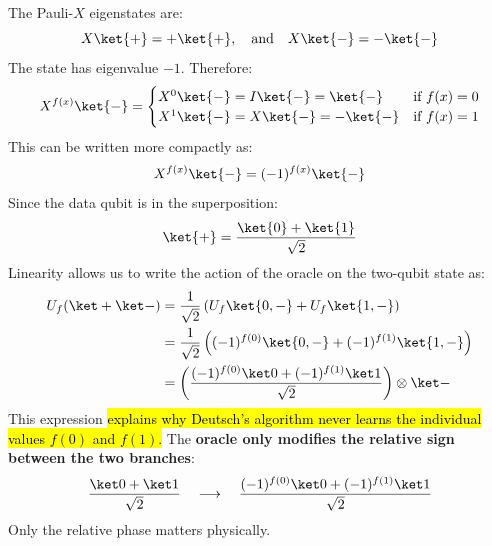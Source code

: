 \highspace
The Pauli-$X$ eigenstates are:
\begin{equation*}
    X\ket{+} = +\ket{+}, \quad \text{and} \quad X\ket{-} = -\ket{-}
\end{equation*}
The state \ket{-} has eigenvalue $-1$. Therefore:
\begin{equation*}
    X^{f(x)} \ket{-} = \begin{cases}
        X^{0} \ket{-} = I\ket{-} = \ket{-} & \text{if } f(x) = 0 \\
        X^{1} \ket{-} = X\ket{-} = -\ket{-} & \text{if } f(x) = 1
    \end{cases}
\end{equation*}
This can be written more compactly as:
\begin{equation*}
    X^{f(x)} \ket{-} = (-1)^{f(x)} \ket{-}
\end{equation*}
Since the data qubit is in the superposition:
\begin{equation*}
    \ket{+}
    =
    \frac{\ket{0}+\ket{1}}{\sqrt{2}}
\end{equation*}
Linearity allows us to write the action of the oracle on the two-qubit state as:
\begin{equation*}
    \begin{aligned}
        U_f(\ket+\ket-)
        &=
        \frac1{\sqrt2}
        \left(
        U_f\ket{0,-}
        +
        U_f\ket{1,-}
        \right)\\
        &=
        \frac1{\sqrt2}
        \left(
        (-1)^{f(0)}\ket{0,-}
        +
        (-1)^{f(1)}\ket{1,-}
        \right)\\
        &=
        \left(
        \frac{
        (-1)^{f(0)}\ket0
        +
        (-1)^{f(1)}\ket1
        }
        {\sqrt2}
        \right)
        \otimes
        \ket-
    \end{aligned}
\end{equation*}
This expression \hl{explains why Deutsch's algorithm never learns the individual values $f(0)$ and $f(1)$.} The \textbf{oracle only modifies the relative sign between the two branches}:
\begin{equation*}
    \frac{\ket0+\ket1}{\sqrt2}
    \quad\longrightarrow\quad
    \frac{
    (-1)^{f(0)}\ket0
    +
    (-1)^{f(1)}\ket1
    }{\sqrt2}
\end{equation*}
Only the relative phase matters physically.
